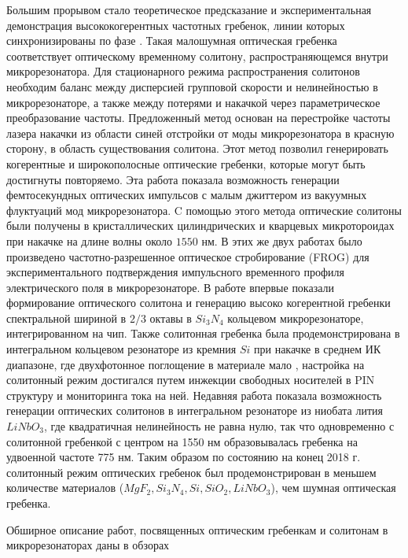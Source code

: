 Большим прорывом стало теоретическое предсказание и экспериментальная демонстрация высококогерентных частотных гребенок, линии которых синхронизированы по фазе \cite{Herr2014}. Такая малошумная оптическая гребенка соответствует оптическому временному солитону, распространяющемся внутри микрорезонатора. Для стационарного режима распространения солитонов необходим баланс между дисперсией групповой скорости и нелинейностью в микрорезонаторе, а также между потерями и накачкой через параметрическое преобразование частоты. Предложенный метод основан на перестройке частоты лазера накачки из области синей отстройки от моды микрорезонатора в красную сторону, в область существования солитона. Этот метод позволил генерировать когерентные и широкополосные оптические гребенки, которые могут быть достигнуты повторяемо. Эта работа показала возможность генерации фемтосекундных оптических импульсов с малым джиттером из вакуумных флуктуаций мод микрорезонатора. C помощью этого метода оптические солитоны были получены в кристаллических цилиндрических \cite{Herr2014} и кварцевых микротороидах \cite{Yi2015} при накачке на длине волны около $1550$ нм. В этих же двух работах было произведено частотно-разрешенное оптическое стробирование (FROG) для экспериментального подтверждения импульсного временного профиля электрического поля в микрорезонаторе. В работе \cite{Brasch2016} впервые показали формирование оптического солитона и генерацию высоко когерентной гребенки спектральной шириной в $2/3$ октавы в $Si_3N_4$ кольцевом микрорезонаторе, интегрированном на чип. Также солитонная гребенка была продемонстрирована в интегральном кольцевом резонаторе из кремния $Si$ при накачке в среднем ИК диапазоне, где двухфотонное поглощение в материале мало \cite{Yu2016}, настройка на солитонный режим достигался путем инжекции свободных носителей в PIN структуру и мониторинга тока на ней. Недавняя работа показала возможность генерации оптических солитонов в интегральном резонаторе из ниобата лития $LiNbO_3$, где квадратичная нелинейность не равна нулю, так что одновременно с солитонной гребенкой с центром на 1550 нм образовывалась гребенка на удвоенной частоте 775 нм. Таким образом по состоянию на конец 2018 г. солитонный режим оптических гребенок был продемонстрирован в меньшем количестве материалов ($MgF_2, Si_3N_4, Si, SiO_2, LiNbO_3$), чем шумная оптическая гребенка.
 
Обширное описание работ, посвященных оптическим гребенкам и солитонам в микрорезонаторах даны в обзорах \cite{Kippenberg2011,ASavchenkov2016,ChemboY2016,PASQUAZI20181,Kippenbergeaan8083}

